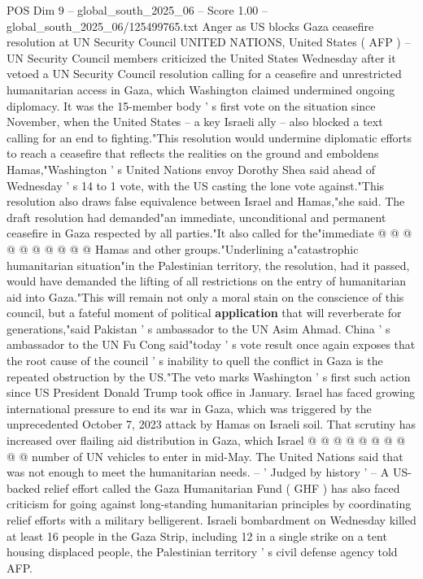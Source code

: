 \begin{textsample}{POS Dim 9 – global\_south\_2025\_06 – Score 1.00 – global\_south\_2025\_06/125499765.txt}  \label{ex:f9_pos_193}
Anger as US blocks Gaza ceasefire resolution at UN Security Council UNITED NATIONS, United States ( AFP ) -- UN Security Council members criticized the United States Wednesday after it vetoed a UN Security Council resolution calling for a ceasefire and unrestricted humanitarian access in Gaza, which Washington claimed undermined ongoing diplomacy.
It was the 15-member body ' s first vote on the situation since November, when the United States -- a key Israeli ally -- also blocked a text calling for an end to fighting."This resolution would undermine diplomatic efforts to reach a ceasefire that reflects the realities on the ground and emboldens Hamas,"Washington ' s United Nations envoy Dorothy Shea said ahead of Wednesday ' s 14 to 1 vote, with the US casting the lone vote against."This resolution also draws false equivalence between Israel and Hamas,"she said.
The draft resolution had demanded"an immediate, unconditional and permanent ceasefire in Gaza respected by all parties."It also called for the"immediate @ @ @ @ @ @ @ @ @ @ Hamas and other groups."Underlining a"catastrophic humanitarian situation"in the Palestinian territory, the resolution, had it passed, would have demanded the lifting of all restrictions on the entry of humanitarian aid into Gaza."This will remain not only a moral stain on the conscience of this council, but a fateful moment of political \textbf{application} that will reverberate for generations,"said Pakistan ' s ambassador to the UN Asim Ahmad.
China ' s ambassador to the UN Fu Cong said"today ' s vote result once again exposes that the root cause of the council ' s inability to quell the conflict in Gaza is the repeated obstruction by the US."The veto marks Washington ' s first such action since US President Donald Trump took office in January.
Israel has faced growing international pressure to end its war in Gaza, which was triggered by the unprecedented October 7, 2023 attack by Hamas on Israeli soil.
That scrutiny has increased over flailing aid distribution in Gaza, which Israel @ @ @ @ @ @ @ @ @ @ number of UN vehicles to enter in mid-May.
The United Nations said that was not enough to meet the humanitarian needs. -- ' Judged by history ' -- A US-backed relief effort called the Gaza Humanitarian Fund ( GHF ) has also faced criticism for going against long-standing humanitarian principles by coordinating relief efforts with a military belligerent.
Israeli bombardment on Wednesday killed at least 16 people in the Gaza Strip, including 12 in a single strike on a tent housing displaced people, the Palestinian territory ' s civil defense agency told AFP.

\end{textsample}
